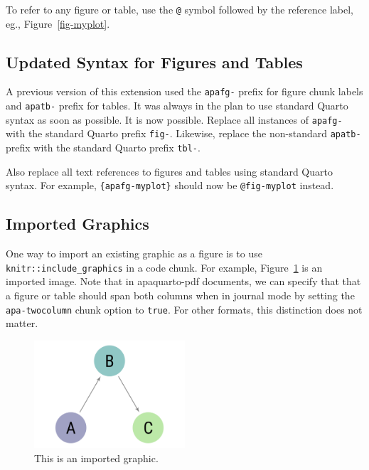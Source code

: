 \documentclass[
  man,
  floatsintext,
  longtable,
  colorlinks=true,linkcolor=blue,citecolor=blue,urlcolor=blue]{apa7}
\begin{document}
To refer to any figure or table, use the \texttt{@} symbol followed by
the reference label, eg., Figure~\ref{fig-myplot}.

\subsection{Updated Syntax for Figures and
Tables}\label{updated-syntax-for-figures-and-tables}

A previous version of this extension used the \texttt{apafg-} prefix for
figure chunk labels and \texttt{apatb-} prefix for tables. It was always
in the plan to use standard Quarto syntax as soon as possible. It is now
possible. Replace all instances of \texttt{apafg-} with the standard
Quarto prefix \texttt{fig-}. Likewise, replace the non-standard
\texttt{apatb-} prefix with the standard Quarto prefix \texttt{tbl-}.

Also replace all text references to figures and tables using standard
Quarto syntax. For example, \texttt{\{apafg-myplot\}} should now be
\texttt{@fig-myplot} instead.

\subsection{Imported Graphics}\label{imported-graphics}

One way to import an existing graphic as a figure is to use
\texttt{knitr::include\_graphics} in a code chunk. For example,
Figure~\ref{fig-importedgraphic} is an imported image. Note that in
apaquarto-pdf documents, we can specify that that a figure or table
should span both columns when in journal mode by setting the
\texttt{apa-twocolumn} chunk option to \texttt{true}. For other formats,
this distinction does not matter.

\label{cell-fig-importedgraphic}
\begin{figure}[h]

{\caption{{This is an imported graphic.}{\label{fig-importedgraphic}}}}

\includegraphics[width=0.5\textwidth,height=\textheight]{4-Outputs/sampleimage.png}

\end{figure}
\end{document}
